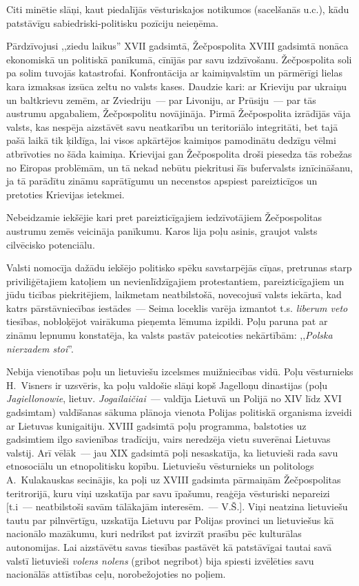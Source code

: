 \documentclass[twoside,a5paper,12pt,fleqn,openany]{extbook}
\newcommand{\pltxti}[1]{\textit{\textpolish{#1}}}
\newcommand{\lttxti}[1]{\textit{\textlithuanian{#1}}}
\newcommand{\latxti}[1]{\textit{\textlatin{#1}}}
\begin{document}
Citi minētie slāņi, kaut piedalījās vēsturiskajos notikumos (sacelšanās u.c.), kādu patstāvīgu sabiedriski-politisku pozīciju neieņēma.

Pārdzīvojusi ,,ziedu laikus'' XVII gadsimtā, Žečpospolita XVIII gadsimtā nonāca ekonomiskā un politiskā panīkumā, cīnījās par savu izdzīvošanu. Žečpospolita soli pa solim tuvojās katastrofai. Konfrontācija ar kaimiņvalstīm un pārmērīgi lielas kara izmaksas izsūca zeltu no valsts kases. Daudzie kari: ar Krieviju par ukraiņu un baltkrievu zemēm, ar Zviedriju~--- par Livoniju, ar Prūsiju~--- par tās austrumu apgabaliem, Žečpospolitu novājināja. Pirmā Žečpospolita izrādījās vāja valsts, kas nespēja aizstāvēt savu neatkarību un teritoriālo integritāti, bet tajā pašā laikā tik ķildīga, lai visos apkārtējos kaimiņos pamodinātu dedzīgu vēlmi atbrīvoties no šāda kaimiņa. Krievijai gan Žečpospolita droši piesedza tās robežas no Eiropas problēmām, un tā nekad nebūtu piekritusi šīs bufervalsts iznīcināšanu, ja tā parādītu zināmu saprātīgumu un necenstos apspiest pareizticīgos un pretoties Krievijas ietekmei.

Nebeidzamie iekšējie kari pret pareizticīgajiem iedzīvotājiem Žečpospolitas austrumu zemēs veicināja panīkumu. Karos lija poļu asinis, graujot valsts cilvēcisko potenciālu.

Valsti nomocīja dažādu iekšējo politisko spēku savstarpējās cīņas, pretrunas starp priviliģētajiem katoļiem un nevienlīdzīgajiem protestantiem, pareizticīgajiem un jūdu ticības piekritējiem, laikmetam neatbilstošā, novecojusī valsts iekārta, kad katrs pārstāvniecības iestādes~--- Seima loceklis varēja izmantot t.s. \latxti{liberum veto} tiesības, nobloķējot vairākuma pieņemta lēmuma izpildi. Poļu paruna pat ar zināmu lepnumu konstatēja, ka valsts pastāv pateicoties nekārtībām: ,,\pltxti{Polska nierzadem stoi}''.

Nebija vienotības poļu un lietuviešu izcelsmes muižniecības vidū. Poļu vēsturnieks H.~Visners ir uzsvēris, ka poļu valdošie slāņi kopš Jagelloņu dinastijas (poļu \pltxti{Jagiellonowie}, lietuv. \lttxti{Jogailaičiai}~--- valdīja Lietuvā un Polijā no XIV līdz XVI gadsimtam) valdīšanas sākuma plānoja vienota Polijas politiskā organisma izveidi ar Lietuvas kunigaitiju. XVIII gadsimtā poļu programma, balstoties uz gadsimtiem ilgo savienības tradīciju, vairs neredzēja vietu suverēnai Lietuvas valstij. Arī vēlāk~--- jau XIX gadsimtā poļi nesaskatīja, ka lietuvieši rada savu etnosociālu un etnopolitisku kopību. Lietuviešu vēsturnieks un politologs A.~Kulakauskas secinājis, ka poļi uz XVIII gadsimta pārmaiņām Žečpospolitas teritrorijā, kuru viņi uzskatīja par savu īpašumu, reaģēja vēsturiski nepareizi [t.i~--- neatbilstoši savām tālākajām interesēm.~--- V.Š.]. Viņi neatzina lietuviešu tautu par pilnvērtīgu, uzskatīja Lietuvu par Polijas provinci un lietuviešus kā nacionālo mazākumu, kuri nedrīkst pat izvirzīt prasību pēc kulturālas autonomijas. Lai aizstāvētu savas tiesības pastāvēt kā patstāvīgai tautai savā valstī lietuvieši \lttxti{volens nolens} (gribot negribot) bija spiesti izvēlēties savu nacionālās attīstības ceļu, norobežojoties no poļiem.
\end{document}
